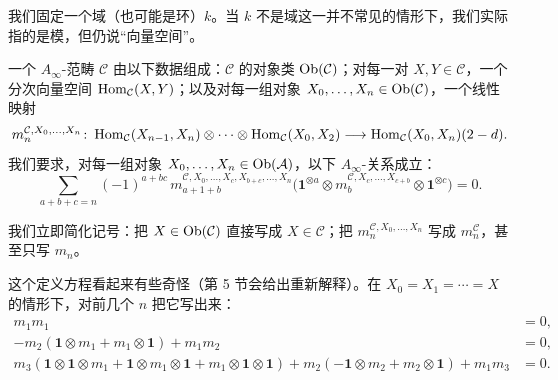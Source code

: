 我们固定一个域（也可能是环）$k$。当 $k$ 不是域这一并不常见的情形下，我们实际指的是模，但仍说“向量空间”。

\begin{definition*}
一个 $A_\infty$-范畴 $\mathcal{C}$ 由以下数据组成：$\mathcal{C}$ 的对象类 $\operatorname{Ob}(\mathcal{C})$；对每一对 $X,Y\in\mathcal{C}$，一个分次向量空间 $\operatorname{Hom}_{\mathcal{C}}(X,Y)$；以及对每一组对象 $X_0,\dots,X_n\in\operatorname{Ob}(\mathcal{C})$，一个线性映射
\begin{equation}\label{eq:ainf-mn}
m_n^{\mathcal{C},X_0,\dots,X_n}\colon
\operatorname{Hom}_{\mathcal{C}}(X_{n-1},X_n)\otimes\cdots\otimes\operatorname{Hom}_{\mathcal{C}}(X_0,X_2)
\longrightarrow \operatorname{Hom}_{\mathcal{C}}(X_0,X_n)(2-d).
\end{equation}
我们要求，对每一组对象 $X_0,\dots,X_n\in\operatorname{Ob}(\mathcal{A})$，以下 $A_\infty$-关系成立：
\begin{equation}\label{eq:ainf-relation}
\sum_{a+b+c=n}(-1)^{a+bc}\,
m_{a+1+b}^{\mathcal{C},X_0,\dots,X_c,X_{b+c},\dots,X_n}
\bigl(\mathbf{1}^{\otimes a}\otimes m_b^{\mathcal{C},X_c,\dots,X_{c+b}}\otimes \mathbf{1}^{\otimes c}\bigr)=0 .
\end{equation}
\end{definition*}


我们立即简化记号：把 $X\in\operatorname{Ob}(\mathcal{C})$ 直接写成 $X\in\mathcal{C}$；把 $m_n^{\mathcal{C},X_0,\dots,X_n}$ 写成 $m_n^{\mathcal{C}}$，甚至只写 $m_n$。

这个定义方程看起来有些奇怪（第 5 节会给出重新解释）。在 $X_0=X_1=\cdots=X$ 的情形下，对前几个 $n$ 把它写出来：
\begin{align}
m_1m_1&=0,\label{eq:ainf-m1}\\
-m_2(\mathbf{1}\otimes m_1+m_1\otimes\mathbf{1})+m_1m_2&=0,\label{eq:ainf-m2}\\
m_3(\mathbf{1}\otimes\mathbf{1}\otimes m_1+\mathbf{1}\otimes m_1\otimes\mathbf{1}+m_1\otimes\mathbf{1}\otimes\mathbf{1})
+m_2(-\mathbf{1}\otimes m_2+m_2\otimes\mathbf{1})+m_1m_3&=0.\label{eq:ainf-m3}
\end{align}

